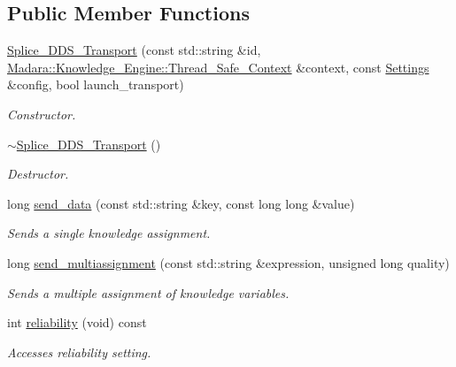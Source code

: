 \subsection*{Public Member Functions}
\begin{DoxyCompactItemize}
\item 
\hyperlink{classMadara_1_1Transport_1_1Splice__DDS__Transport_a95014e038f696bc0625b742a78e8d1ed}{Splice\_\-DDS\_\-Transport} (const std::string \&id, \hyperlink{classMadara_1_1Knowledge__Engine_1_1Thread__Safe__Context}{Madara::Knowledge\_\-Engine::Thread\_\-Safe\_\-Context} \&context, const \hyperlink{classMadara_1_1Transport_1_1Settings}{Settings} \&config, bool launch\_\-transport)
\begin{DoxyCompactList}\small\item\em Constructor. \item\end{DoxyCompactList}\item 
\hyperlink{classMadara_1_1Transport_1_1Splice__DDS__Transport_a3376c76ae236ee9bc216385f3fe7a0ef}{$\sim$Splice\_\-DDS\_\-Transport} ()
\begin{DoxyCompactList}\small\item\em Destructor. \item\end{DoxyCompactList}\item 
long \hyperlink{classMadara_1_1Transport_1_1Splice__DDS__Transport_a674f89a8095d37429426e22b224b6ac0}{send\_\-data} (const std::string \&key, const long long \&value)
\begin{DoxyCompactList}\small\item\em Sends a single knowledge assignment. \item\end{DoxyCompactList}\item 
long \hyperlink{classMadara_1_1Transport_1_1Splice__DDS__Transport_adb8f5f2c6ae97c68cfe1fbb9228f67c5}{send\_\-multiassignment} (const std::string \&expression, unsigned long quality)
\begin{DoxyCompactList}\small\item\em Sends a multiple assignment of knowledge variables. \item\end{DoxyCompactList}\item 
int \hyperlink{classMadara_1_1Transport_1_1Splice__DDS__Transport_ab96f7bd8b74f919e82abed51eced7d74}{reliability} (void) const 
\begin{DoxyCompactList}\small\item\em Accesses reliability setting. \item\end{DoxyCompactList}\item 

\end{DoxyCompactItemize}
